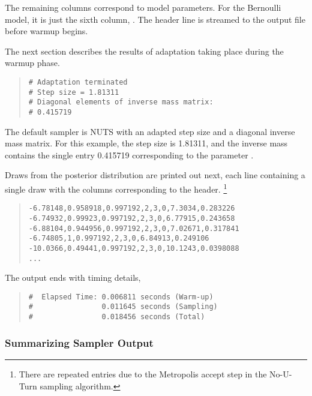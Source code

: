 %
The remaining columns correspond to model parameters. For the
Bernoulli model, it is just the sixth column, . The header
line is streamed to the output file before warmup begins.

The next section describes the results of adaptation taking place during
the warmup phase.
%
\begin{quote}
\begin{Verbatim}[fontsize=\small]
# Adaptation terminated
# Step size = 1.81311
# Diagonal elements of inverse mass matrix:
# 0.415719
\end{Verbatim}
\end{quote}
%
The default sampler is NUTS with an adapted step size and a diagonal
inverse mass matrix.  For this example, the step size is 1.81311, and
the inverse mass contains the single entry 0.415719 corresponding to
the parameter .

Draws from the posterior distribution are printed out next, each line
containing a single draw with the columns corresponding to the
header.
%
\footnote{There are repeated entries due to the Metropolis accept step
in the No-U-Turn sampling algorithm.}
%
%
\begin{quote}
\begin{Verbatim}[fontsize=\small]
-6.78148,0.958918,0.997192,2,3,0,7.3034,0.283226
-6.74932,0.99923,0.997192,2,3,0,6.77915,0.243658
-6.88104,0.944956,0.997192,2,3,0,7.02671,0.317841
-6.74805,1,0.997192,2,3,0,6.84913,0.249106
-10.0366,0.49441,0.997192,2,3,0,10.1243,0.0398088
...
\end{Verbatim}
\end{quote}
%

The output ends with timing details,%
\begin{quote}
\begin{Verbatim}[fontsize=\small]
#  Elapsed Time: 0.006811 seconds (Warm-up)
#                0.011645 seconds (Sampling)
#                0.018456 seconds (Total)
\end{Verbatim}
\end{quote}


\subsubsection{Summarizing Sampler Output}

